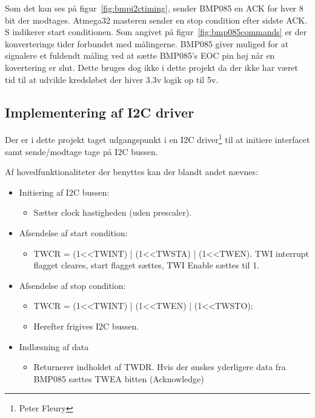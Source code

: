 Som det kan ses på figur~\ref{fig:bmpi2ctiming}, sender BMP085 en ACK for hver 8 bit der modtages. Atmega32 masteren sender en stop condition efter sidste ACK. S indikerer start conditionen.
Som angivet på figur~\ref{fig:bmp085commands} er der konverterings tider forbundet med målingerne. BMP085 giver muliged for at signalere et fuldendt måling ved at sætte BMP085’s EOC pin høj når en kovertering er slut. Dette bruges dog ikke i dette projekt da der ikke har været tid til at udvikle kredsløbet der hiver 3.3v logik op til 5v.

\subsection{Implementering af I2C driver}
Der er i dette projekt taget udgangspunkt i en I2C driver\footnote{Peter Fleury} til at initiere interfacet samt sende/modtage tage på I2C bussen.

Af hovedfunktionaliteter der benyttes kan der blandt andet nævnes:

\begin{itemize}
	\item Initiering af I2C bussen:
	\begin{itemize}
		\item Sætter clock hastigheden (uden prescaler).
	\end{itemize}
	
	\item Afsendelse af start condition:
	\begin{itemize}
		\item TWCR = (1<<TWINT) | (1<<TWSTA) | (1<<TWEN). TWI interrupt flagget cleares, start flagget sættes, TWI Enable sættes til 1.
	\end{itemize}
	
	\item Afsendelse af stop condition:
	\begin{itemize}
		\item TWCR = (1<<TWINT) | (1<<TWEN) | (1<<TWSTO);
		\item Herefter frigives I2C bussen.
	\end{itemize}
	
	\item Indlæsning af data
	\begin{itemize}
		\item Returnerer indholdet af TWDR. Hvis der ønskes yderligere data fra BMP085 sættes TWEA bitten (Acknowledge)
	\end{itemize}
	
\end{itemize}

